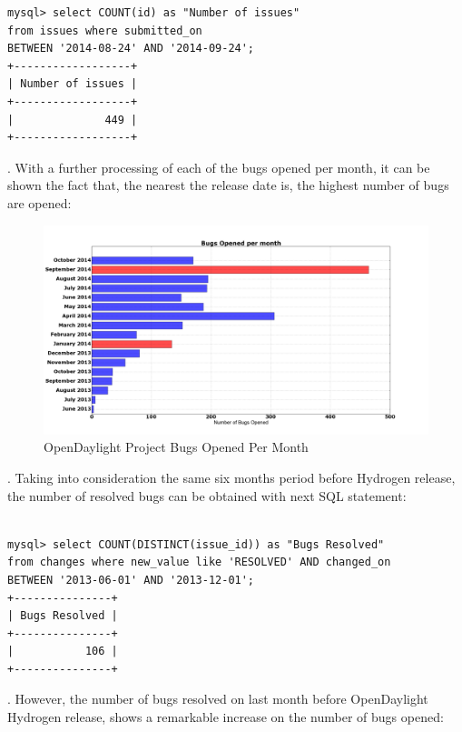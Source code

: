\documentclass[a4paper, 12pt]{book}
\begin{document}
{\begin{verbatim}
mysql> select COUNT(id) as "Number of issues"
from issues where submitted_on
BETWEEN '2014-08-24' AND '2014-09-24';
+------------------+
| Number of issues |
+------------------+
|              449 |
+------------------+

\end{verbatim}
.
With a further processing of each of the bugs opened per month, it can be shown the fact that, the nearest the release date is, the highest number of bugs are opened:
\begin{center}
 \begin{figure}[H]
 \begin{center}
   \includegraphics[width=17cm]{img/bugs_opened_month_01.png}
   \caption{OpenDaylight Project Bugs Opened Per Month}
   \label{fig:odl_bugs_opened_month}
 \end{center}
 \end{figure}
\end{center}
. Taking into consideration the same six months period before Hydrogen release, the number of resolved bugs can be obtained with next SQL statement:
\begin{verbatim}

mysql> select COUNT(DISTINCT(issue_id)) as "Bugs Resolved"
from changes where new_value like 'RESOLVED' AND changed_on
BETWEEN '2013-06-01' AND '2013-12-01';
+---------------+
| Bugs Resolved |
+---------------+
|           106 |
+---------------+

\end{verbatim}
. However, the number of bugs resolved on last month before OpenDaylight Hydrogen release, shows a remarkable increase on the number of bugs opened:

}
\end{document}
